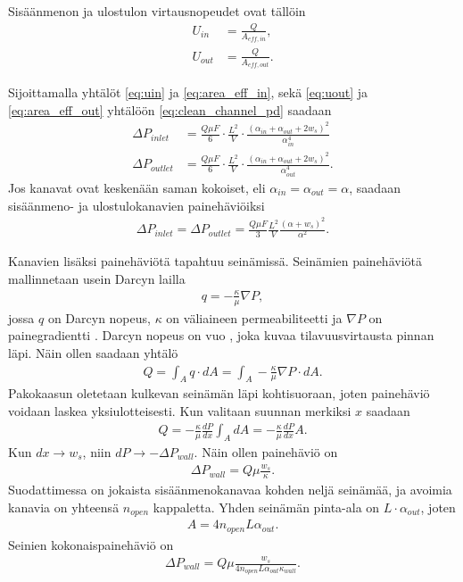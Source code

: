 Sisäänmenon ja ulostulon virtausnopeudet ovat tällöin
\begin{align}
    U_{in} &= \frac{Q}{A_{eff, in}}, \label{eq:uin}\\
    U_{out} &= \frac{Q}{A_{eff, out}}. \label{eq:uout}
\end{align}

Sijoittamalla yhtälöt \eqref{eq:uin} ja \eqref{eq:area_eff_in}, sekä \eqref{eq:uout} ja \eqref{eq:area_eff_out} yhtälöön \eqref{eq:clean_channel_pd} saadaan
\begin{align}
    \Delta P_{inlet} &=\frac{Q \mu F}{6}\cdot \frac{L^2}{V} \cdot \frac{(\alpha_{in}+\alpha_{out}+2w_s)^2}{\alpha_{in}^4} \label{eq:DeltaP_inlet_clean}
    \\ 
    \Delta P_{outlet} &=\frac{Q \mu F}{6}\cdot \frac{L^2}{V} \cdot \frac{(\alpha_{in}+\alpha_{out}+2w_s)^2}{\alpha_{out}^4}.
\end{align}
Jos kanavat ovat keskenään saman kokoiset, eli  \(\alpha_{in}=\alpha_{out}=\alpha\), saadaan sisäänmeno- ja ulostulokanavien painehäviöiksi 
\begin{align}
    \Delta P_{inlet}= \Delta P_{outlet} =  \frac{Q\mu F}{3} \frac{L^2}{V}\frac{(\alpha+w_s)^2}{\alpha^2}.
\end{align}


Kanavien lisäksi painehäviötä tapahtuu seinämissä. Seinämien painehäviötä mallinnetaan usein Darcyn lailla \cite{dieselnet_wall_flow_monolith}\cite{Konstandopoulos1989_wallflow}
\begin{align}
    q = - \frac{\kappa}{\mu}\nabla P,
\end{align}
jossa \(q\) on Darcyn nopeus, \(\kappa\) on väliaineen permeabiliteetti ja \(\nabla P\) on painegradientti \cite{feder2021_porous}. 
 Darcyn nopeus on vuo \cite{reible_env_eng}, joka kuvaa tilavuusvirtausta pinnan läpi. Näin ollen saadaan yhtälö
\begin{align}
    Q = \int_A q \cdot dA = \int_A - \frac{\kappa}{\mu} \nabla P \cdot dA.
\end{align}
Pakokaasun oletetaan kulkevan seinämän läpi kohtisuoraan, joten painehäviö voidaan laskea yksiulotteisesti. Kun valitaan suunnan merkiksi \(x\) saadaan
\begin{align}
    Q = - \frac{\kappa}{\mu} \frac{dP}{dx} \int_A dA = - \frac{\kappa}{\mu} \frac{dP}{dx} A.
\end{align}
Kun \(dx \to w_s\), niin \(dP \to -\Delta P_{wall}\). Näin ollen painehäviö on
\begin{align}
    \Delta P_{wall} = Q\mu \frac{w_s}{\kappa}.
\end{align}
Suodattimessa on jokaista sisäänmenokanavaa kohden neljä seinämää, ja avoimia kanavia on yhteensä \(n_{open}\) kappaletta. Yhden seinämän pinta-ala on \(L\cdot \alpha_{out}\), joten 
\begin{align}
    A = 4 n_{open} L \alpha_{out}.
\end{align}
Seinien kokonaispainehäviö on
\begin{align}
    \Delta P_{wall} =  Q \mu \frac{w_s}{4 n_{open} L  \alpha_{out}  \kappa_{wall}}.
\end{align}

